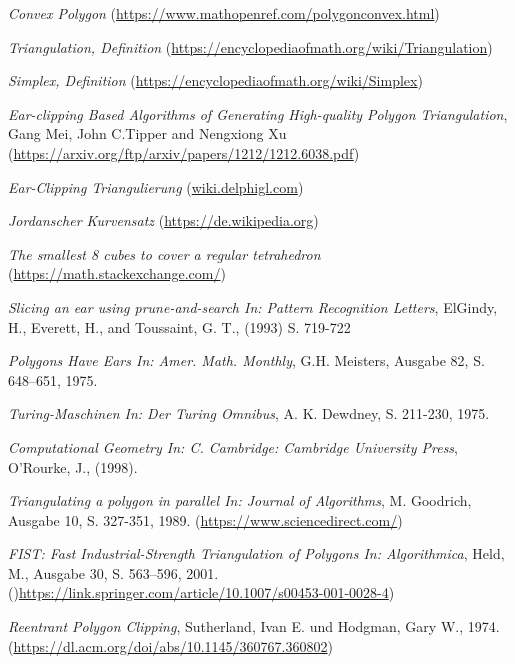 \begin{thebibliography}{11}
    \emph{Convex Polygon} \break
    (\href{https://www.mathopenref.com/polygonconvex.html}{https://www.mathopenref.com/polygonconvex.html})
    
    \emph{Triangulation, Definition} \break
    (\href{https://encyclopediaofmath.org/wiki/Triangulation}{https://encyclopediaofmath.org/wiki/Triangulation})
    
    \emph{Simplex, Definition} \break
    (\href{https://encyclopediaofmath.org/wiki/Simplex}{https://encyclopediaofmath.org/wiki/Simplex})
    
    \emph{Ear-clipping Based Algorithms of Generating High-quality Polygon Triangulation}, Gang Mei, John C.Tipper and Nengxiong Xu \break 
    (\href{https://arxiv.org/ftp/arxiv/papers/1212/1212.6038.pdf}{https://arxiv.org/ftp/arxiv/papers/1212/1212.6038.pdf})
    
    \emph{Ear-Clipping Triangulierung} \break
    (\href{https://wiki.delphigl.com/index.php/Ear_Clipping_Triangulierung}{wiki.delphigl.com})
   
    \emph{Jordanscher Kurvensatz} \break
    (\href{https://de.wikipedia.org/wiki/Jordanscher_Kurvensatz}{https://de.wikipedia.org})

    \emph{The smallest 8 cubes to cover a regular tetrahedron} \break
    (\href{https://math.stackexchange.com/questions/1423014/the-smallest-8-cubes-to-cover-a-regular-tetrahedron}{https://math.stackexchange.com/})
  
    \emph{Slicing an ear using prune-and-search In: Pattern Recognition Letters}, ElGindy, H., Everett, H., and Toussaint, G. T., (1993) S. 719-722

    \emph{Polygons Have Ears In: Amer. Math. Monthly}, G.H. Meisters, Ausgabe 82, S. 648–651, 1975.

    \emph{Turing-Maschinen In: Der Turing Omnibus}, A. K. Dewdney, S. 211-230, 1975.

    \emph{Computational Geometry In: C. Cambridge: Cambridge University Press}, O’Rourke, J., (1998). 

    \emph{Triangulating a polygon in parallel In: Journal of Algorithms}, M. Goodrich, Ausgabe 10, S. 327-351, 1989. \break
    (\href{https://www.sciencedirect.com/science/article/pii/0196677489900321}{https://www.sciencedirect.com/})

    \emph{FIST: Fast Industrial-Strength Triangulation of Polygons In: Algorithmica}, Held, M., Ausgabe 30, S. 563–596, 2001.
    ()\href{https://link.springer.com/article/10.1007/s00453-001-0028-4}{https://link.springer.com/article/10.1007/s00453-001-0028-4})
    
    \emph{Reentrant Polygon Clipping}, Sutherland, Ivan E. und Hodgman, Gary W., 1974. \break
    (\href{https://dl.acm.org/doi/abs/10.1145/360767.360802}{https://dl.acm.org/doi/abs/10.1145/360767.360802})
\end{thebibliography}